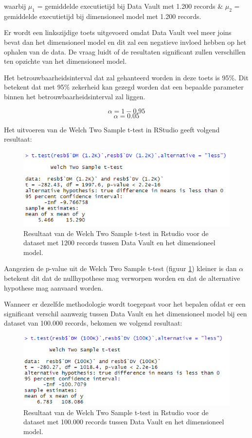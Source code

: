 waarbij
$\mu_1$ = gemiddelde executietijd bij Data Vault met 1.200 records \&
$\mu_2$ = gemiddelde executietijd bij dimensioneel model met 1.200 records.

Er wordt een linkszijdige toets uitgevoerd omdat Data Vault veel meer joins bevat dan het dimensioneel model en dit zal een negatieve invloed hebben op het ophalen van de data. De vraag luidt of de resultaten significant zullen verschillen ten opzichte van het dimensioneel model.

Het betrouwbaarheidsinterval dat zal gehanteerd worden in deze toets is 95\%. Dit betekent dat met 95\% zekerheid
kan gezegd worden dat een bepaalde parameter binnen het
betrouwbaarheidsinterval zal liggen.

\[
\alpha = 1 - 0.95
\]
\[
\alpha = 0.05
\]

Het uitvoeren van de Welch Two Sample t-test in RStudio geeft volgend resultaat:

\begin{figure}[h]
	\centering
	\includegraphics[scale=0.7]{../images/Ttest1200.png}
	\caption{Resultaat van de Welch Two Sample t-test in Rstudio voor de dataset met 1200 records tussen Data Vault en het dimensioneel model. }
	\label{fig:ttest1200}
\end{figure}

Aangezien de p-value uit de Welch Two Sample t-test (figuur \ref{fig:ttest1200}) kleiner is dan $\alpha$ betekent dit dat de nullhypothese mag verworpen worden en dat de alternative hypothese mag aanvaard worden.

Wanneer er dezelfde methodologie wordt toegepast voor het bepalen ofdat er een significant verschil aanwezig tussen Data Vault en het dimensioneel model bij een dataset van 100.000 records, bekomen we volgend resultaat:

\begin{figure}[h]
	\centering
	\includegraphics[scale=0.7]{../images/Ttest100000.png}
	\caption{Resultaat van de Welch Two Sample t-test in Rstudio voor de dataset met 100.000 records tussen Data Vault en het dimensioneel model. }
	\label{fig:ttest100000}
\end{figure}

